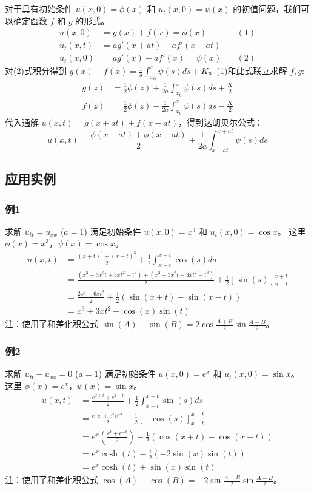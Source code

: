 \documentclass{article}
\begin{document}
	对于具有初始条件 $u(x,0) = \phi(x)$ 和 $u_t(x,0) = \psi(x)$ 的初值问题，我们可以确定函数 $f$ 和 $g$ 的形式。
	\begin{align*}
		u(x,0) &= g(x) + f(x) = \phi(x) \quad &(1) \\
		u_t(x,t) &= ag'(x+at) - af'(x-at) \\
		u_t(x,0) &= ag'(x) - af'(x) = \psi(x) \quad &(2)
	\end{align*}
	对(2)式积分得到 $g(x) - f(x) = \frac{1}{a} \int_{x_0}^x \psi(s)ds + K$。(1)和此式联立求解 $f, g$:
	\begin{align*}
		g(z) &= \frac{1}{2}\phi(z) + \frac{1}{2a} \int_{x_0}^z \psi(s)ds + \frac{K}{2} \\
		f(z) &= \frac{1}{2}\phi(z) - \frac{1}{2a} \int_{x_0}^z \psi(s)ds - \frac{K}{2}
	\end{align*}
	代入通解 $u(x,t) = g(x+at) + f(x-at)$，得到达朗贝尔公式：
	$$ u(x,t) = \frac{\phi(x+at) + \phi(x-at)}{2} + \frac{1}{2a}\int_{x-at}^{x+at} \psi(s)ds $$
	
	\subsection{应用实例}
	\subsubsection*{例1}
	求解 $u_{tt} = u_{xx}$ ($a=1$) 满足初始条件 $u(x,0) = x^3$ 和 $u_t(x,0) = \cos x$。
	这里 $\phi(x) = x^3$，$ \psi(x) = \cos x$。
	\begin{align*}
		u(x,t) &= \frac{(x+t)^3 + (x-t)^3}{2} + \frac{1}{2} \int_{x-t}^{x+t} \cos(s)ds \\
		&= \frac{(x^3 + 3x^2t + 3xt^2 + t^3) + (x^3 - 3x^2t + 3xt^2 - t^3)}{2} + \frac{1}{2} [\sin(s)]_{x-t}^{x+t} \\
		&= \frac{2x^3 + 6xt^2}{2} + \frac{1}{2} (\sin(x+t) - \sin(x-t)) \\
		&= x^3 + 3xt^2 + \cos(x)\sin(t)
	\end{align*}
	注：使用了和差化积公式 $\sin(A)-\sin(B) = 2\cos\frac{A+B}{2}\sin\frac{A-B}{2}$。
	
	\subsubsection*{例2}
	求解 $u_{tt} - u_{xx} = 0$ ($a=1$) 满足初始条件 $u(x,0) = e^x$ 和 $u_t(x,0) = \sin x$。
	这里 $\phi(x) = e^x$，$ \psi(x) = \sin x$。
	\begin{align*}
		u(x,t) &= \frac{e^{x+t} + e^{x-t}}{2} + \frac{1}{2} \int_{x-t}^{x+t} \sin(s)ds \\
		&= \frac{e^x e^t + e^x e^{-t}}{2} + \frac{1}{2} [-\cos(s)]_{x-t}^{x+t} \\
		&= e^x \left(\frac{e^t + e^{-t}}{2}\right) - \frac{1}{2} (\cos(x+t) - \cos(x-t)) \\
		&= e^x \cosh(t) - \frac{1}{2} (-2\sin(x)\sin(t)) \\
		&= e^x \cosh(t) + \sin(x)\sin(t)
	\end{align*}
	注：使用了和差化积公式 $\cos(A)-\cos(B) = -2\sin\frac{A+B}{2}\sin\frac{A-B}{2}$。
	
\end{document}
